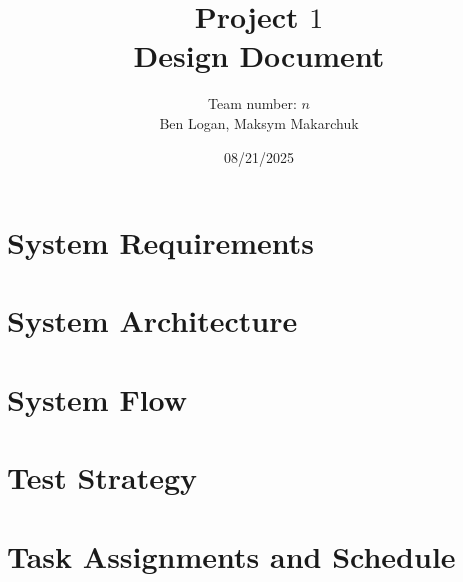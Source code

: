 \documentclass[12pt]{article}
\title{Project $1$ \\ Design Document}
\author{Team number: $n$ \\ Ben Logan, Maksym Makarchuk}
\date{08/21/2025}
\begin{document}
\maketitle

\section{System Requirements}
\section{System Architecture}
\section{System Flow}
\section{Test Strategy}
\section{Task Assignments and Schedule}
\end{document}
